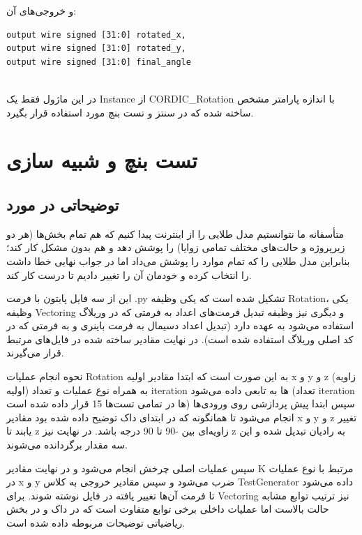 \documentclass[12pt,titlepage,a4page , tikz , multi,table , svgnames,xcdraw]{article}
\begin{document}
و خروجی‌های آن:


\begin{latin}

\begin{verbatim}
output wire signed [31:0] rotated_x,
output wire signed [31:0] rotated_y,
output wire signed [31:0] final_angle
   
\end{verbatim}

\end{latin}

در این ماژول فقط یک Instance از CORDIC\_Rotation با اندازه پارامتر مشخص ساخته شده که در سنتز و تست بنچ مورد استفاده قرار بگیرد.


\newpage


\section{تست بنچ و شبیه سازی}

\subsection{توضیحاتی در مورد }

متأسفانه ما نتوانستیم مدل طلایی را از اینترنت پیدا کنیم که هم تمام بخش‌ها (هر دو زیرپروژه و حالت‌های مختلف تمامی زوایا) را پوشش دهد و هم بدون مشکل کار کند؛ بنابراین مدل طلایی را که تمام موارد را پوشش می‌داد اما در جواب نهایی خطا داشت را انتخاب کرده و خودمان آن را تغییر دادیم تا درست کار کند.

این  از سه فایل پایتون با فرمت .py تشکیل شده است که یکی وظیفه Rotation، یکی وظیفه Vectoring و دیگری نیز وظیفه تبدیل فرمت‌های اعداد به فرمتی که در وریلاگ استفاده می‌شود به عهده دارد (تبدیل اعداد دسیمال به فرمت باینری و به فرمتی که در کد اصلی وریلاگ استفاده شده است). در نهایت مقادیر ساخته شده در فایل‌های مرتبط قرار می‌گیرند.

نحوه انجام عملیات Rotation به این صورت است که ابتدا مقادیر اولیه x و y و z (زاویه اولیه) به همراه نوع عملیات و تعداد iteration ها به تابعی داده می‌شود (تعداد iteration ها در تمامی تست‌ها 15  قرار داده شده است) سپس ابتدا پیش پردازشی روی ورودی‌ها انجام می‌شود تا همانگونه که در ابتدای داک توضیح داده شده بود مقادیر x و y و z تغییر یابند تا z زاویه‌ای بین -90 تا 90 درجه باشد. در نهایت نیز z به رادیان تبدیل شده و این سه مقدار برگردانده می‌شوند.

سپس عملیات اصلی چرخش انجام می‌شود و در نهایت مقادیر K مرتبط با نوع عملیات در x و y ضرب می‌شود و سپس مقادیر خروجی به کلاس TestGenerator داده می‌شود تا فرمت آن‌ها تغییر یافته در فایل نوشته شوند.
برای Vectoring نیز ترتیب توابع مشابه حالت بالاست اما عملیات داخلی برخی توابع متفاوت است که در داک و در بخش ریاضیاتی توضیحات مربوطه داده شده است.
\end{document}
